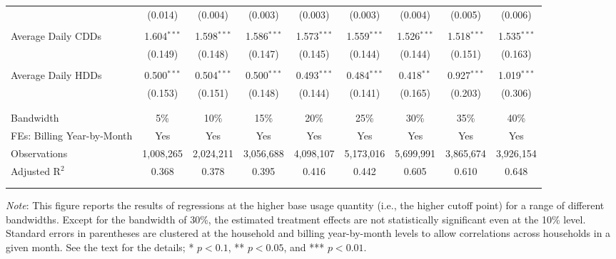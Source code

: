 {\begin{table}[t!]
\begin{adjustbox}{scale = 0.775}
\begin{threeparttable}
\begin{tabular}{@{\extracolsep{0pt}}lcccccccc}
                    & (0.014) & (0.004) & (0.003) & (0.003) & (0.003) & (0.004) & (0.005) & (0.006) \\ 
                    & & & & & & & & \\ 
                    Average Daily CDDs & 1.604$^{***}$ & 1.598$^{***}$ & 1.586$^{***}$ & 1.573$^{***}$ & 1.559$^{***}$ & 1.526$^{***}$ & 1.518$^{***}$ & 1.535$^{***}$ \\ 
                    & (0.149) & (0.148) & (0.147) & (0.145) & (0.144) & (0.144) & (0.151) & (0.163) \\ 
                    & & & & & & & & \\ 
                    Average Daily HDDs & 0.500$^{***}$ & 0.504$^{***}$ & 0.500$^{***}$ & 0.493$^{***}$ & 0.484$^{***}$ & 0.418$^{**}$ & 0.927$^{***}$ & 1.019$^{***}$ \\ 
                    & (0.153) & (0.151) & (0.148) & (0.144) & (0.141) & (0.165) & (0.203) & (0.306) \\ 
                    & & & & & & & & \\
                    \hline
                    \\[-2.0ex]
                    Bandwidth & 5\% & 10\% & 15\% & 20\% & 25\% & 30\% & 35\% & 40\% \\ 
                    FEs: Billing Year-by-Month & Yes & Yes & Yes & Yes & Yes & Yes & Yes & Yes \\ 
                    Observations & 1,008,265 & 2,024,211 & 3,056,688 & 4,098,107 & 5,173,016 & 5,699,991 & 3,865,674 & 3,926,154 \\ 
                    Adjusted R$^{2}$ & 0.368 & 0.378 & 0.395 & 0.416 & 0.442 & 0.605 & 0.610 & 0.648 \\ 
                    \\[-2.0ex]
                    \hline \hline
                    \\[-4.5ex]
                \end{tabular}
                \begin{tablenotes}[flushleft]
                    \footnotesize
                    \item \textit{Note}: This figure reports the results of regressions at the higher base usage quantity (i.e., the higher cutoff point) for a range of different bandwidths. Except for the bandwidth of 30\%, the estimated treatment effects are not statistically significant even at the 10\% level. Standard errors in parentheses are clustered at the household and billing year-by-month levels to allow correlations across households in a given month. See the text for the details; * $p < 0.1$, ** $p < 0.05$, and *** $p < 0.01$.
                \end{tablenotes}
            \end{threeparttable}
        \end{adjustbox}
    \end{table}
}
